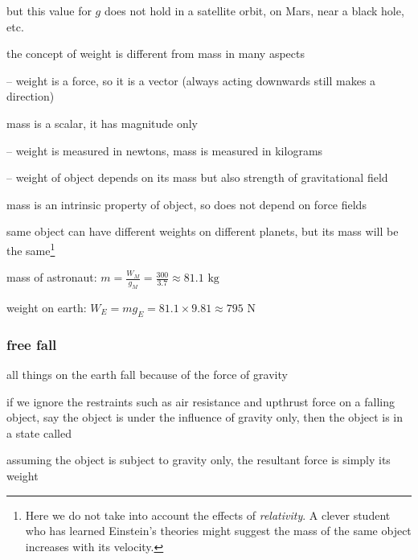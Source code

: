 but this value for $g$ does not hold in a satellite orbit, on Mars, near a black hole, etc.

\cmt the concept of weight is different from mass in many aspects

\begin{compactitem}
	\item[--] weight is a force, so it is a vector (always acting downwards still makes a direction)
	
	mass is a scalar, it has magnitude only
	
	\item[--] weight is measured in newtons, mass is measured in kilograms
	
	\item[--] weight of object depends on its mass but also strength of gravitational field
	
	mass is an intrinsic property of object, so does not depend on force fields
	
	same object can have different weights on different planets, but its mass will be the same\footnote{Here we do not take into account the effects of \emph{relativity}. A clever student who has learned Einstein's theories might suggest the mass of the same object increases with its velocity.}
\end{compactitem}


\sol mass of astronaut: $m = \frac{W_M}{g_M} = \frac{300}{3.7} \approx 81.1 \text{ kg}$

weight on earth: $W_E = mg_E = 81.1 \times 9.81 \approx 795 \text{ N}$ \eoe

\subsubsection*{free fall}

all things on the earth fall because of the force of gravity

if we ignore the restraints such as air resistance and upthrust force on a falling object, say the object is under the influence of gravity only, then the object is in a state called 



assuming the object is subject to gravity only, the resultant force is simply its weight

